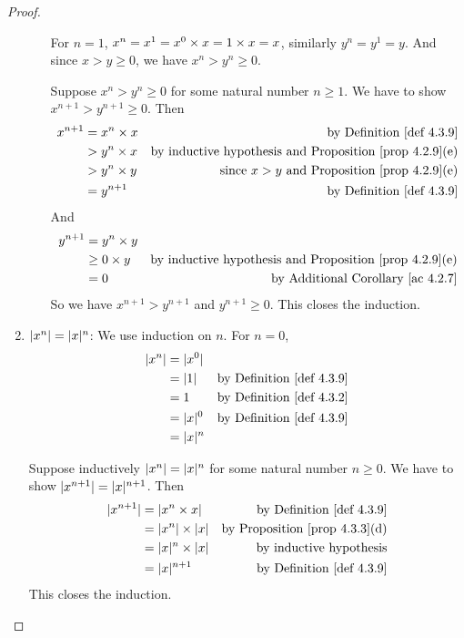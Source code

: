 \begin{proof}
\begin{enumerate}
\begin{itemize}
                For \(n = 1\), \(x^n = x^1 = x^0 \times x = 1 \times x = x\), similarly \(y^n = y^1 = y\).
                And since \(x > y \ge 0\), we have \(x^n > y^n \ge 0\).
                
                Suppose \(x^n > y^n \ge 0\) for some natural number \(n \ge 1\).
                We have to show \(x^{n + 1} > y^{n + 1} \ge 0\).
                Then
                \begin{align*}
                    x^{n + 1} & = x^n \X x & \text{by \DEF{4.3.9}} \\
                              & > y^n \X x & \text{by inductive hypothesis and \PROP{4.2.9}(e)} \\
                              & > y^n \X y & \text{since \(x > y\) and \PROP{4.2.9}(e)} \\
                              & = y^{n + 1} & \text{by \DEF{4.3.9}}
                \end{align*}
                And
                \begin{align*}
                    y^{n + 1} & = y^n \X y \\
                              & \ge 0 \X y & \text{by inductive hypothesis and \PROP{4.2.9}(e)} \\
                              & = 0 & \text{by \AC{4.2.7}}
                \end{align*}
                So we have \(x^{n + 1} > y^{n + 1}\) and \(y^{n + 1} \ge 0\).
                This closes the induction.
        \end{itemize}
    \item \(\lvert x^n\rvert = \lvert x\rvert^n\):
        We use induction on \(n\).
        For \(n = 0\),
        \begin{align*}
            \abs{x^n} & = \abs{x^0} \\
                      & = \abs{1} & \text{by \DEF{4.3.9}} \\
                      & = 1 & \text{by \DEF{4.3.2}} \\
                      & = \abs{x}^0 & \text{by \DEF{4.3.9}} \\
                      & = \abs{x}^n
        \end{align*}
        
        Suppose inductively \(\lvert x^n\rvert = \lvert x\rvert^n\) for some natural number \(n \ge 0\).
        We have to show \(\lvert x^{n + 1}\rvert = \lvert x\rvert^{n + 1}\).
        Then
        \begin{align*}
            \abs{x^{n + 1}} & = \abs{x^n \X x} & \text{by \DEF{4.3.9}} \\
                            & = \abs{x^n} \X \abs{x} & \text{by \PROP{4.3.3}(d)} \\
                            & = \abs{x}^n \X \abs{x} & \text{by inductive hypothesis} \\
                            & = \abs{x}^{n + 1} & \text{by \DEF{4.3.9}}
        \end{align*}
        This closes the induction.
\end{enumerate}
\end{proof}

